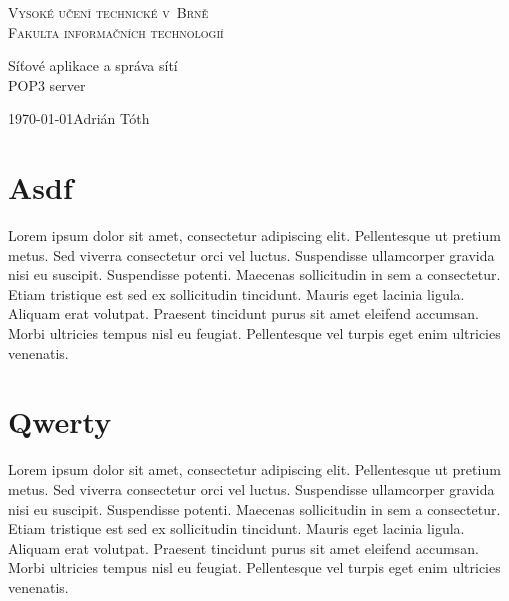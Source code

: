 \documentclass[11pt,a4paper]{article}
\begin{document}

\begin{titlepage}

\begin{center}

	\thispagestyle{empty}

	\textsc {
		\Huge Vysoké učení technické v~Brně\\[0.4em]
		\huge Fakulta informačních technologií
	}\\


	{
		\LARGE Síťové aplikace a správa sítí\\[0.4em]
		\Huge POP3 server
	}


\end{center}

	{
		\LARGE \today \hfill Adrián Tóth
	}

\end{titlepage}	

\setlength{\parskip}{0pt}
{\hypersetup{hidelinks}\tableofcontents}
\setlength{\parskip}{0pt}

\newpage %

\section{Asdf}
Lorem ipsum dolor sit amet, consectetur adipiscing elit. Pellentesque ut pretium metus. Sed viverra consectetur orci vel luctus. Suspendisse ullamcorper gravida nisi eu suscipit. Suspendisse potenti. Maecenas sollicitudin in sem a consectetur. Etiam tristique est sed ex sollicitudin tincidunt. Mauris eget lacinia ligula. Aliquam erat volutpat. Praesent tincidunt purus sit amet eleifend accumsan. Morbi ultricies tempus nisl eu feugiat. Pellentesque vel turpis eget enim ultricies venenatis. 

\section{Qwerty}
Lorem ipsum dolor sit amet, consectetur adipiscing elit\cite{Xyz}. Pellentesque ut pretium metus. Sed viverra consectetur orci vel luctus. Suspendisse ullamcorper gravida nisi eu suscipit. Suspendisse potenti. Maecenas sollicitudin in sem a consectetur. Etiam tristique est sed ex sollicitudin tincidunt. Mauris eget lacinia ligula. Aliquam erat volutpat. Praesent tincidunt purus sit amet eleifend accumsan. Morbi ultricies tempus nisl eu feugiat. Pellentesque vel turpis eget enim ultricies venenatis.

\newpage %

\makeatletter
\makeatother

\begin{flushleft}
	
\end{flushleft}
\end{document}

